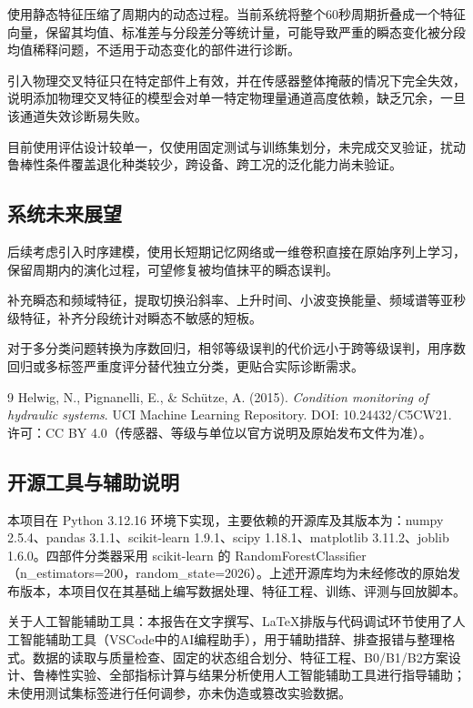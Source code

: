 \documentclass[12pt, a4paper]{ctexart}
\begin{document}
使用静态特征压缩了周期内的动态过程。当前系统将整个60秒周期折叠成一个特征向量，保留其均值、标准差与分段差分等统计量，可能导致严重的瞬态变化被分段均值稀释问题，不适用于动态变化的部件进行诊断。

引入物理交叉特征只在特定部件上有效，并在传感器整体掩蔽的情况下完全失效，说明添加物理交叉特征的模型会对单一特定物理量通道高度依赖，缺乏冗余，一旦该通道失效诊断易失败。

目前使用评估设计较单一，仅使用固定测试与训练集划分，未完成交叉验证，扰动鲁棒性条件覆盖退化种类较少，跨设备、跨工况的泛化能力尚未验证。
\subsection{系统未来展望}
后续考虑引入时序建模，使用长短期记忆网络或一维卷积直接在原始序列上学习，保留周期内的演化过程，可望修复被均值抹平的瞬态误判。

补充瞬态和频域特征，提取切换沿斜率、上升时间、小波变换能量、频域谱等亚秒级特征，补齐分段统计对瞬态不敏感的短板。

对于多分类问题转换为序数回归，相邻等级误判的代价远小于跨等级误判，用序数回归或多标签严重度评分替代独立分类，更贴合实际诊断需求。
\begin{thebibliography}{9}
 Helwig, N., Pignanelli, E., \& Schütze, A. (2015). \textit{Condition monitoring of hydraulic systems}. UCI Machine Learning Repository. DOI: 10.24432/C5CW21. 许可：CC BY 4.0（传感器、等级与单位以官方说明及原始发布文件为准）。
\end{thebibliography}

\subsection*{开源工具与辅助说明}
本项目在 Python 3.12.16 环境下实现，主要依赖的开源库及其版本为：numpy 2.5.4、pandas 3.1.1、scikit-learn 1.9.1、scipy 1.18.1、matplotlib 3.11.2、joblib 1.6.0。四部件分类器采用 scikit-learn 的 RandomForestClassifier（n\_estimators=200，random\_state=2026）。上述开源库均为未经修改的原始发布版本，本项目仅在其基础上编写数据处理、特征工程、训练、评测与回放脚本。

关于人工智能辅助工具：本报告在文字撰写、\LaTeX 排版与代码调试环节使用了人工智能辅助工具（VSCode中的AI编程助手），用于辅助措辞、排查报错与整理格式。数据的读取与质量检查、固定的状态组合划分、特征工程、B0/B1/B2方案设计、鲁棒性实验、全部指标计算与结果分析使用人工智能辅助工具进行指导辅助；未使用测试集标签进行任何调参，亦未伪造或篡改实验数据。
\end{document}

